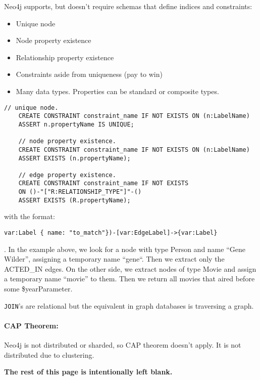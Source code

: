 \documentclass{report}
\newenvironment{example}{\begin{tcolorbox}[title={Example},colback=green!5!white,colframe=black!75!green]}{\end{tcolorbox}}
\renewcommand{\bf}[1]{\textbf{{#1}}}
\renewcommand{\tt}[1]{\texttt{{#1}}}
\begin{document}
Neo4j supports, but doesn't require schemas that define indices and constraints:
\begin{itemize}[label=$\to$]
    \item Unique node
    \item Node property existence
    \item Relationship property existence
    \item Constraints aside from uniqueness (pay to win)
    \item Many data types. Properties can be standard or composite types.
\end{itemize}
\begin{example}
\begin{lstlisting}[language=Cypher, style=colorEX]
    // unique node.
    CREATE CONSTRAINT constraint_name IF NOT EXISTS ON (n:LabelName)
    ASSERT n.propertyName IS UNIQUE;

    // node property existence.
    CREATE CONSTRAINT constraint_name IF NOT EXISTS ON (n:LabelName)
    ASSERT EXISTS (n.propertyName);

    // edge property existence.
    CREATE CONSTRAINT constraint_name IF NOT EXISTS
    ON ()-"["R:RELATIONSHIP_TYPE"]"-()
    ASSERT EXISTS (R.propertyName);
\end{lstlisting}
with the format:
\begin{BVerbatim}
var:Label { name: "to_match"})-[var:EdgeLabel]->{var:Label}
\end{BVerbatim}
. In the example above, we look for a node with type Person and name
``Gene Wilder'', assigning a temporary name ``gene``. Then we extract only the
ACTED\_IN edges. On the other side, we extract nodes of type Movie and assign a
temporary name ``movie'' to them. Then we return all movies that aired before some
\$yearParameter.
\end{example}

\tt{JOIN}'s are relational but the equivalent in graph databases is traversing a
graph.

\paragraph{CAP Theorem:} Neo4j is not distributed or sharded, so CAP theorem
doesn't apply. It is not distributed due to clustering.
\vspace{5em}

\begin{center}
    \bf{The rest of this page is intentionally left blank.}
\end{center}
\end{document}
